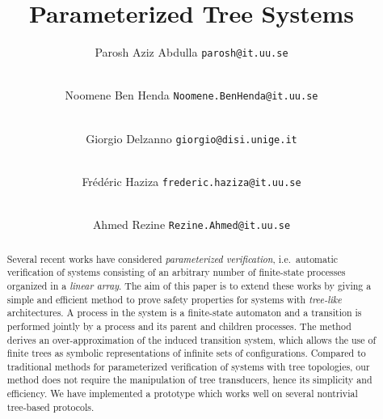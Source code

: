\title{Parameterized Tree Systems}


\author{Parosh Aziz Abdulla
\texttt{parosh@it.uu.se}
\and \\
Noomene Ben Henda
\texttt{Noomene.BenHenda@it.uu.se}
\and \\
Giorgio Delzanno
\texttt{giorgio@disi.unige.it}
\and \\
Fr\'ed\'eric Haziza
\texttt{frederic.haziza@it.uu.se}
\and \\
Ahmed Rezine
\texttt{Rezine.Ahmed@it.uu.se}
}


\maketitle

\begin{abstract}
%
Several recent works have considered \emph{parameterized verification},
i.e.\ automatic verification of systems consisting of an arbitrary
number of finite-state processes organized in a \emph{linear array}.
%
The aim of this paper is to extend these works by giving a simple and
efficient method to prove safety properties for systems with
\emph{tree-like} architectures.
%
A process in the system is a finite-state automaton and a transition
is performed jointly by a process and its parent and children
processes.
%
The method derives an over-approximation of the induced transition
system, which allows the use of finite trees as symbolic
representations of infinite sets of configurations.
%
Compared to traditional methods for parameterized verification of
systems with tree topologies, our method does not require the
manipulation of tree transducers, hence its simplicity and efficiency.
%
We have implemented a prototype which works well on several nontrivial
tree-based protocols.

\end{abstract}

